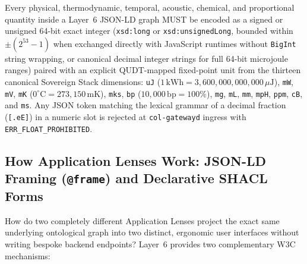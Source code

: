 \begin{invariant}
\label{inv:zero-float-jsonld}
Every physical, thermodynamic, temporal, acoustic, chemical, and proportional quantity inside a Layer~6 JSON-LD graph MUST be encoded as a signed or unsigned 64-bit exact integer (\texttt{xsd:long} or \texttt{xsd:unsignedLong}, bounded within $\pm(2^{53}-1)$ when exchanged directly with JavaScript runtimes without \texttt{BigInt} string wrapping, or canonical decimal integer strings for full 64-bit microjoule ranges) paired with an explicit QUDT-mapped fixed-point unit from the thirteen canonical Sovereign Stack dimensions: \texttt{uJ} ($1\,\mathrm{kWh} = 3{,}600{,}000{,}000{,}000\,\mu\mathrm{J}$), \texttt{mW}, \texttt{mV}, \texttt{mK} ($0^\circ\mathrm{C} = 273{,}150\,\mathrm{mK}$), \texttt{mks}, \texttt{bp} ($10{,}000\,\mathrm{bp} = 100\%$), \texttt{mg}, \texttt{mL}, \texttt{mm}, \texttt{mpH}, \texttt{ppm}, \texttt{cB}, and \texttt{ms}. Any JSON token matching the lexical grammar of a decimal fraction (\texttt{[.eE]}) in a numeric slot is rejected at \texttt{col-gatewayd} ingress with \texttt{ERR\_FLOAT\_PROHIBITED}.
\end{invariant}

\subsection{How Application Lenses Work: JSON-LD Framing (\texttt{@frame}) and Declarative SHACL Forms}

How do two completely different Application Lenses project the exact same underlying ontological graph into two distinct, ergonomic user interfaces without writing bespoke backend endpoints? Layer~6 provides two complementary W3C mechanisms:

